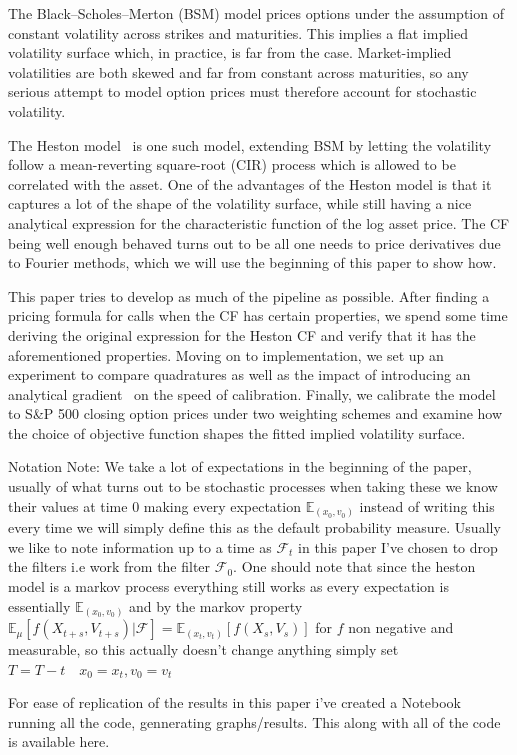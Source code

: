 
The Black--Scholes--Merton (BSM) model prices options under the assumption of constant volatility across strikes and maturities.
This implies a flat implied volatility surface which, in practice, is far from the case. Market-implied volatilities are both skewed and far from
constant across maturities, so any serious attempt to model option prices must therefore account for stochastic volatility.

The Heston model~\cite{heston1993} is one such model, extending BSM by letting the volatility follow a mean-reverting square-root (CIR) process
which is allowed to be correlated with the asset. One of the advantages of the Heston model is that it captures a lot of the shape of the volatility surface,
while still having a nice analytical expression for the characteristic function of the log asset price. The CF being well enough behaved turns out to be all one needs to price derivatives
due to Fourier methods, which we will use the beginning of this paper to show how.

This paper tries to develop as much of the pipeline as possible. After finding a pricing formula for calls when the CF has certain properties,
we spend some time deriving the original expression for the Heston CF and verify that it has the aforementioned properties. Moving on to implementation, we set
up an experiment to compare quadratures as well as the impact of introducing an analytical gradient~\cite{germano2017} on the speed of calibration. Finally,
we calibrate the model to S\&P 500 closing option prices under two weighting schemes and examine how the choice of objective function shapes the fitted implied volatility surface.



Notation Note: We take a lot of expectations in the beginning of the paper, usually of what turns out to be stochastic processes when taking these we know their values at time 0 making every expectation $\mathbb{E}_{(x_0,v_0)}$ 
instead of writing this every time we will simply define this as the default probability measure. Usually we like to note information up to a time as $\mathcal{F}_t$ in this paper I've chosen to drop the filters i.e work from the filter $\mathcal{F}_0$. One should 
note that since the heston model is a markov process everything still works as every expectation is essentially $\mathbb{E}_{(x_0,v_0)}$ and by the markov property 
$\mathbb{E}_\mu[f(X_{t+s},V_{t+s})|\mathcal{F}]=\mathbb{E}_{(x_t,v_t)}[f(X_s,V_s)]$ for $f$ non negative and measurable, so this actually doesn't change anything simply set $T=T-t\quad x_0=x_t,v_0=v_t$

For ease of replication of the results in this paper i've created a Notebook running all the code, gennerating graphs/results. This along with all of the code is available here\cite{github_repo}.


